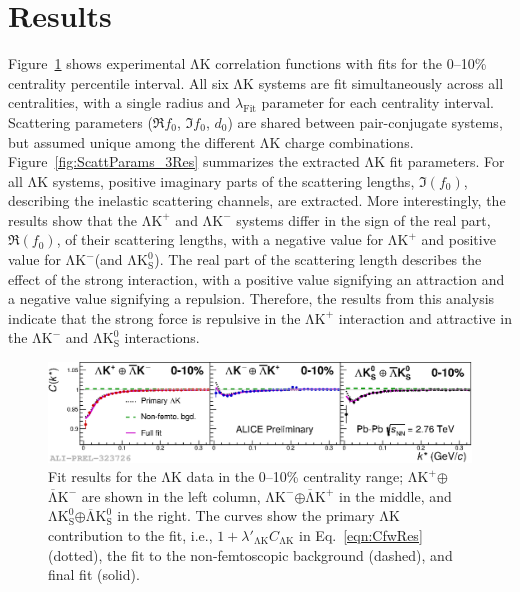 \documentclass{svproc}
\newcommand{\LamK}{$\mathrm{\Lambda}\mathrm{K}$\xspace}
\newcommand{\LamKchP}{$\mathrm{\Lambda}\mathrm{K^{+}}$\xspace}
\newcommand{\ALamKchM}{$\overline{\mathrm{\Lambda}}\mathrm{K^{-}}$\xspace}
\newcommand{\LamKchM}{$\mathrm{\Lambda}\mathrm{K^{-}}$\xspace}
\newcommand{\ALamKchP}{$\overline{\mathrm{\Lambda}}\mathrm{K^{+}}$\xspace}
\newcommand{\LamKs}{$\mathrm{\Lambda}\mathrm{K^{0}_{S}}$\xspace}
\newcommand{\ALamKs}{$\overline{\mathrm{\Lambda}}\mathrm{K^{0}_{S}}$\xspace}
\begin{document}
\section{Results}
\label{sec:Results}

Figure~\ref{fig:LamKFits_3Res} shows experimental \LamK correlation functions with fits for the 0--10\% centrality percentile interval.
All six \LamK systems are fit simultaneously across all centralities, with a single radius and $\lambda_{\mathrm{Fit}}$ parameter for each centrality interval.
Scattering parameters ($\Re f_{0}$, $\Im f_{0}$, $d_{0}$) are shared between pair-conjugate systems, but assumed unique among the different \LamK charge combinations. 
Figure~\ref{fig:ScattParams_3Res} summarizes the extracted \LamK fit parameters.
For all \LamK systems, positive imaginary parts of the scattering lengths, $\Im(f_{0})$, describing the inelastic scattering channels, are extracted. 
More interestingly, the results show that the \LamKchP and \LamKchM systems differ in the sign of the real part, $\Re(f_{0})$, of their scattering lengths, with a negative value for \LamKchP and positive value for \LamKchM (and \LamKs).
The real part of the scattering length describes the effect of the strong interaction, with a positive value signifying an attraction and a negative value signifying a repulsion.
Therefore, the results from this analysis indicate that the strong force is repulsive in the \LamKchP interaction and attractive in the \LamKchM and \LamKs interactions.
\begin{figure}[h!]
  \centering
  \includegraphics[width=\linewidth]{./Figures/Approved/OtherFormats/EPS/2019-06-11-canKStarCfwFits_CombineConj_0010_LabelLines.eps}
  \caption[\LamK data with fits]
  {
  Fit results for the \LamK data in the 0--10\% centrality range; \LamKchP$\oplus$\ALamKchM are shown in the left column, \LamKchM$\oplus$\ALamKchP in the middle, and \LamKs$\oplus$\ALamKs in the right. 
  The curves show the primary \LamK contribution to the fit, i.e., $1 + \lambda'_{\mathrm{\Lambda}\mathrm{K}}C_{\mathrm{\Lambda}\mathrm{K}}$ in Eq.~\ref{eqn:CfwRes} (dotted), the fit to the non-femtoscopic background (dashed), and final fit (solid).
 }
  \label{fig:LamKFits_3Res}
\end{figure}
\end{document}
